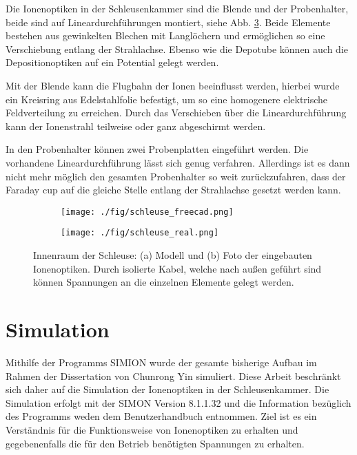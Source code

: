 Die Ionenoptiken in der Schleusenkammer sind die Blende und der Probenhalter, beide sind auf Lineardurchführungen montiert, siehe Abb. \ref{fig:schleuse_innen}.
Beide Elemente bestehen aus gewinkelten Blechen mit Langlöchern und ermöglichen so eine Verschiebung entlang der Strahlachse.
Ebenso wie die Depotube können auch die Depositionoptiken auf ein Potential gelegt werden.

Mit der Blende kann die Flugbahn der Ionen beeinflusst werden, hierbei wurde ein Kreisring aus Edelstahlfolie befestigt, um so eine homogenere elektrische Feldverteilung zu erreichen.
Durch das Verschieben über die Lineardurchführung kann der Ionenstrahl teilweise oder ganz abgeschirmt werden.

In den Probenhalter können zwei Probenplatten eingeführt werden.
Die vorhandene Lineardurchführung lässt sich genug verfahren.
Allerdings ist es dann nicht mehr möglich den gesamten Probenhalter so weit zurückzufahren, dass der Faraday cup auf die gleiche Stelle entlang der Strahlachse gesetzt werden kann.
\begin{figure}
    \begin{subfigure}[t]{0.478\textwidth}
      \texttt{[image: ./fig/schleuse\_freecad.png]}
      \caption{}
      \label{fig:schleuse_freecad}
    \end{subfigure}\hfill
    \begin{subfigure}[t]{0.475\textwidth}
      \texttt{[image: ./fig/schleuse\_real.png]}
      \caption{}
      \label{fig:schleuse_real}
    \end{subfigure}
    \caption{Innenraum der Schleuse: (a) Modell und (b) Foto der eingebauten Ionenoptiken. Durch isolierte Kabel, welche nach außen geführt sind können Spannungen an die einzelnen Elemente gelegt werden.}
    \label{fig:schleuse_innen}
\end{figure}


\section{Simulation}
Mithilfe der Programms SIMION \cite{Manura.2008} wurde der gesamte bisherige Aufbau im Rahmen der Dissertation von Chunrong Yin \cite{Yin.2007} simuliert.
Diese Arbeit beschränkt sich daher auf die Simulation der Ionenoptiken in der Schleusenkammer.
Die Simulation erfolgt mit der SIMON Version 8.1.1.32 und die Information bezüglich des Programms weden dem Benutzerhandbuch entnommen.
Ziel ist es ein Verständnis für die Funktionsweise von Ionenoptiken zu erhalten und gegebenenfalls die für den Betrieb benötigten Spannungen zu erhalten.

